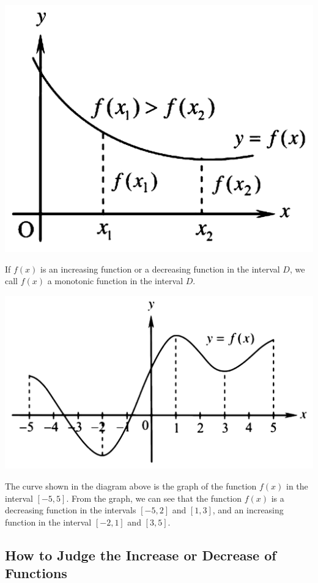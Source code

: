 \begin{enumerate}
\begin{center}
              \includegraphics[scale=0.25]{assets/26-3.png}
          \end{center}
\end{enumerate}
If $f(x)$ is an increasing function or a decreasing function in the interval $D$, we call $f(x)$ a monotonic function in the interval $D$.
\begin{center}
    \includegraphics[scale=0.25]{assets/26-4.png}
\end{center}
The curve shown in the diagram above is the graph of the function $f(x)$ in the
interval $[-5, 5]$. From the graph, we can see that the function $f(x)$ is a
decreasing function in the intervals $[-5, 2]$ and $[1, 3]$, and an increasing
function in the interval $[-2, 1]$ and $[3, 5]$.
\newpage

\subsection*{How to Judge the Increase or Decrease of Functions}

